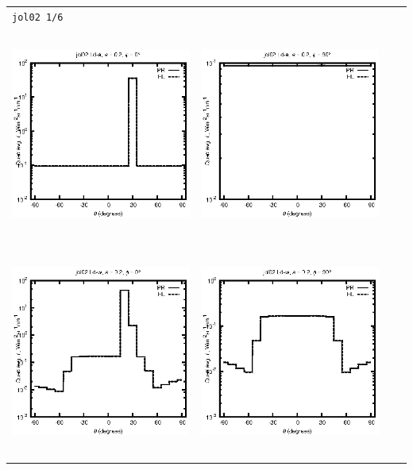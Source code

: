 \begin{tabular}{c c c c}
\multicolumn{4}{l}{\texttt{jol02 1/6}} \\
\includegraphics[height=7cm]{../eps/jol02_Ld_a_fwd.eps} &
\includegraphics[height=7cm]{../eps/jol02_Ld_a_cross.eps}\\
\includegraphics[height=7cm]{../eps/jol02_Ld_w_fwd.eps} &
\includegraphics[height=7cm]{../eps/jol02_Ld_w_cross.eps} \\

\end{tabular}
